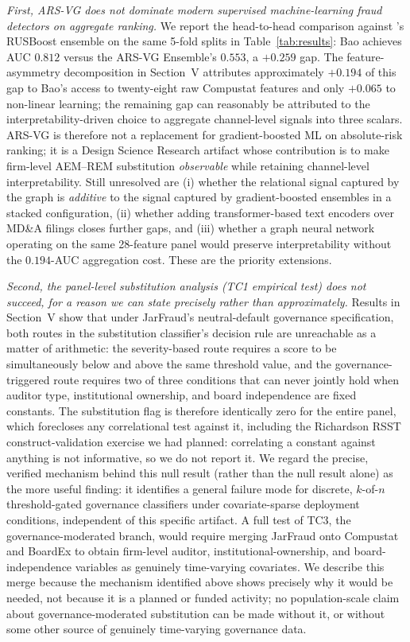 \documentclass[12pt]{article}
\begin{document}
\emph{First, ARS-VG does not dominate modern supervised machine-learning
fraud detectors on aggregate ranking.}  We report the head-to-head
comparison against \citet{bao2020}'s RUSBoost ensemble on the same
5-fold splits in Table~\ref{tab:results}: Bao achieves AUC $0.812$
versus the ARS-VG Ensemble's $0.553$, a $+0.259$ gap.  The
feature-asymmetry decomposition in Section~V
attributes approximately $+0.194$ of this gap to Bao's access to
twenty-eight raw Compustat features and only $+0.065$ to non-linear
learning; the remaining gap can reasonably be attributed to the
interpretability-driven choice to aggregate channel-level signals into
three scalars.  ARS-VG is therefore not a replacement for gradient-boosted
ML on absolute-risk ranking; it is a Design Science Research
artifact whose contribution is to make firm-level AEM--REM substitution
\emph{observable} while retaining channel-level interpretability.
Still unresolved are (i) whether the relational signal captured by the
graph is \emph{additive} to the signal captured by gradient-boosted
ensembles in a stacked configuration, (ii) whether adding transformer-based
text encoders over MD\&A filings \citep{craja2020} closes further
gaps, and (iii) whether a graph neural network operating on the same
28-feature panel would preserve interpretability without the
$0.194$-AUC aggregation cost.  These are the priority extensions.

\emph{Second, the panel-level substitution analysis (TC1 empirical
test) does not succeed, for a reason we can state precisely rather
than approximately.}  Results in Section~V show that under JarFraud's
neutral-default governance specification, both routes in the
substitution classifier's decision rule are unreachable as a matter of
arithmetic: the severity-based route requires a score to be
simultaneously below and above the same threshold value, and the
governance-triggered route requires two of three conditions that can
never jointly hold when auditor type, institutional ownership, and
board independence are fixed constants.  The substitution flag is
therefore identically zero for the entire panel, which forecloses any
correlational test against it, including the Richardson RSST
construct-validation exercise we had planned: correlating a constant
against anything is not informative, so we do not report it.  We
regard the precise, verified mechanism behind this null result (rather
than the null result alone) as the more useful finding: it identifies
a general failure mode for discrete, $k$-of-$n$ threshold-gated
governance classifiers under covariate-sparse deployment conditions,
independent of this specific artifact.  A full test of TC3, the
governance-moderated branch, would require merging JarFraud onto Compustat
and BoardEx to obtain firm-level auditor, institutional-ownership, and
board-independence variables as genuinely time-varying covariates.
We describe this merge because the mechanism identified above shows
precisely why it would be needed, not because it is a planned or
funded activity; no population-scale claim about governance-moderated
substitution can be made without it, or without some other source of
genuinely time-varying governance data.
\end{document}
